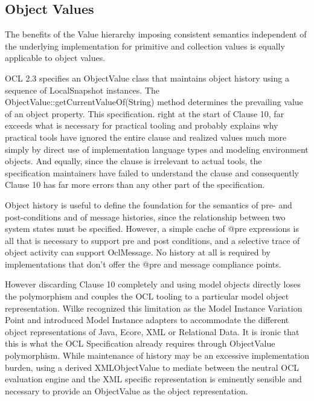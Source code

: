 \documentclass{eceasst}
\begin{document}
\subsection{Object Values}

The benefits of the Value hierarchy imposing consistent semantics independent of the underlying implementation for primitive and collection values is equally applicable to object values.

OCL 2.3 specifies an ObjectValue class that maintains object history using a sequence of LocalSnapshot instances. The  ObjectValue::getCurrentValueOf(String) method determines the prevailing value of an object property. This specification. right at the start of Clause 10, far exceeds what is necessary for practical tooling and probably explains why practical tools have ignored the entire clause and realized values  much more simply by direct use of implementation language types and modeling environment objects. And equally, since the clause is irrelevant to actual tools, the specification maintainers have failed to understand the clause and consequently Clause 10 has far more errors than any other part of the specification.

Object history is useful to define the foundation for the semantics of pre- and post-conditions and of message histories, since the relationship between two system states must be specified. However, a simple cache of @pre expressions is all that is necessary to support pre and post conditions, and a selective trace of object activity can support OclMessage. No history at all is required by implementations that don't offer the @pre and message compliance points.

However discarding Clause 10 completely and using model objects directly loses the polymorphism and couples the OCL tooling to a particular model object representation. Wilke\cite{Variability} recognized this limitation as the Model Instance Variation Point and introduced Model Instance adapters to accommodate the different object representations of Java, Ecore, XML or Relational Data. It is ironic that this is what the OCL Specification already requires through ObjectValue polymorphism. While maintenance of history may be an excessive implementation burden, using a derived XMLObjectValue to mediate between the neutral OCL evaluation engine and the XML specific representation is eminently sensible and necessary to provide an ObjectValue as the object representation.
\end{document}

